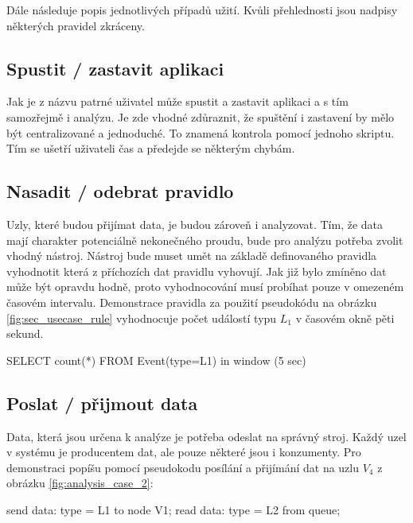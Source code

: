 \documentclass[
  digital, %
  table,   %
  nolof,     %
  nolot,     %
  oneside, %
  nocover,
  monochrome,
  12pt
]{fithesis3}
\begin{document}
Dále následuje popis jednotlivých případů užití. Kvůli přehlednosti jsou nadpisy některých pravidel zkráceny.

\subsection*{Spustit / zastavit aplikaci}
Jak je z názvu patrné uživatel může spustit a zastavit aplikaci a s tím samozřejmě i analýzu. Je zde vhodné zdůraznit, že spuštění i zastavení by mělo být centralizované a jednoduché. To znamená kontrola pomocí jednoho skriptu. Tím se ušetří uživateli čas a předejde se některým chybám.

\subsection*{Nasadit / odebrat pravidlo}
\label{sec:usecase_rule}
Uzly, které budou přijímat data, je budou zároveň i analyzovat. Tím, že data mají charakter potenciálně nekonečného proudu, bude pro analýzu potřeba zvolit vhodný nástroj. Nástroj bude muset umět na základě definovaného pravidla vyhodnotit která z příchozích dat pravidlu vyhovují. Jak již bylo zmíněno dat může být opravdu hodně, proto vyhodnocování musí probíhat pouze v omezeném časovém intervalu. Demonstrace pravidla za použití pseudokódu na obrázku \ref{fig:sec_usecase_rule} vyhodnocuje počet událostí typu \textit{$L_1$} v časovém okně pěti sekund.

\begin{center}
\begin{minipage}[H]{.95\linewidth}
	\begin{mylisting}
SELECT count(*) FROM Event(type=L1) in window (5 sec)
	\end{mylisting}
	\label{fig:sec_usecase_rule} 
\end{minipage}
\end{center}

\subsection*{Poslat / přijmout data}
Data, která jsou určena k analýze je potřeba odeslat na správný stroj. Každý uzel v systému je producentem dat, ale pouze některé jsou i konzumenty. Pro demonstraci popíšu pomocí pseudokodu posílání a přijímání dat na uzlu \textit{$V_4$} z obrázku \ref{fig:analysis_case_2}:

\begin{center}
\begin{minipage}[H]{.6\linewidth}
	\begin{mylisting}
send data: {type = L1} to node V1;			
read data: {type = L2} from queue;			
	\end{mylisting}
	\label{fig:sec_usecase_rule} 
\end{minipage}
\end{center}
\end{document}
